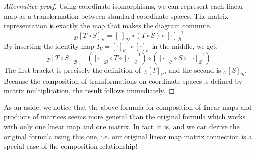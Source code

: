 \documentclass[../linear_algebra_and_groups.tex]{subfiles}
\begin{document}
\begin{proof}[Alternative proof]
    Using coordinate isomorphisms, we can represent each linear map as a transformation between standard coordinate spaces. The matrix representation is exactly the map that makes the diagram commute.
    \[ 
    {}_\mathcal{D}[T\circ S]_\mathcal{B} = [\cdot]_\mathcal{D} \circ (T\circ S) \circ [\cdot]^{-1}_\mathcal{B} 
    \]
    By inserting the identity map $I_V = [\cdot]^{-1}_\mathcal{C} \circ [\cdot]_\mathcal{C}$ in the middle, we get:
    \[ 
    {}_\mathcal{D}[T\circ S]_\mathcal{B} = ([\cdot]_\mathcal{D} \circ T \circ [\cdot]^{-1}_\mathcal{C}) \circ ([\cdot]_\mathcal{C} \circ S \circ [\cdot]^{-1}_\mathcal{B}) 
    \]
    The first bracket is precisely the definition of ${}_\mathcal{D}[T]_\mathcal{C}$, and the second is ${}_\mathcal{C}[S]_\mathcal{B}$. Because the composition of transformations on coordinate spaces is defined by matrix multiplication, the result follows immediately.
    \qedhere
\end{proof}

As an aside, we notice that the above formula for composition of linear maps and products of matrices seems more general than the original formula which works with only one linear map and one matrix. In fact, it is, and we can derive the original formula using this one, i.e. our original linear map matrix connection is a special case of the composition relationship!
\end{document}
